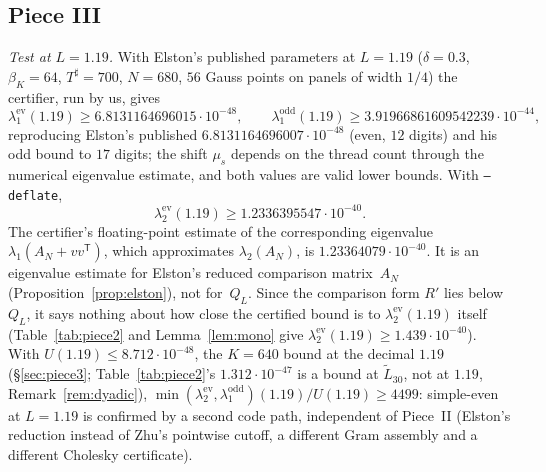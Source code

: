 \documentclass[11pt]{amsart}
\newcommand{\ev}{\mathrm{ev}}
\newcommand{\od}{\mathrm{odd}}
\newcommand{\Tsh}{T^{\sharp}}
\newcommand{\e}[1]{\cdot 10^{#1}}
\newcommand{\Tp}{\mathsf T}
\theoremstyle{definition}
\theoremstyle{remark}
\numberwithin{equation}{section}
\begin{document}
\subsection{Piece III}\label{sec:results3}
\emph{Test at $L=1.19$.} With Elston's published parameters at $L=1.19$ ($\delta=0.3$, $\beta_K=64$, $\Tsh=700$, $N=680$, $56$ Gauss points on panels of width $1/4$) the certifier, run by us, gives
\[
\lambda_1^\ev(1.19)\ge6.8131164696015\e{-48},\qquad \lambda_1^\od(1.19)\ge3.91966861609542239\e{-44},
\]
reproducing Elston's published $6.8131164696007\e{-48}$ (even, $12$ digits) and his odd bound to $17$ digits; the shift $\mu_s$ depends on the thread count through the numerical eigenvalue estimate, and both values are valid lower bounds. With \texttt{--deflate},
\[
\lambda_2^\ev(1.19)\ge1.2336395547\e{-40}.
\]
The certifier's floating-point estimate of the corresponding eigenvalue $\lambda_1(A_N+vv^{\Tp})$, which approximates $\lambda_2(A_N)$, is $1.23364079\e{-40}$. It is an eigenvalue estimate for Elston's reduced comparison matrix~$A_N$ (Proposition~\ref{prop:elston}), not for~$Q_L$. Since the comparison form $R'$ lies below $Q_L$, it says nothing about how close the certified bound is to $\lambda_2^\ev(1.19)$ itself (Table~\ref{tab:piece2} and Lemma~\ref{lem:mono} give $\lambda_2^\ev(1.19)\ge1.439\e{-40}$). With $U(1.19)\le8.712\e{-48}$, the $K=640$ bound at the decimal $1.19$ (\S\ref{sec:piece3}; Table~\ref{tab:piece2}'s $1.312\e{-47}$ is a bound at $\tilde L_{30}$, not at $1.19$, Remark~\ref{rem:dyadic}), $\min(\lambda_2^\ev,\lambda_1^\od)(1.19)/U(1.19)\ge4499$: simple-even at $L=1.19$ is confirmed by a second code path, independent of Piece~II (Elston's reduction instead of Zhu's pointwise cutoff, a different Gram assembly and a different Cholesky certificate).
\end{document}
